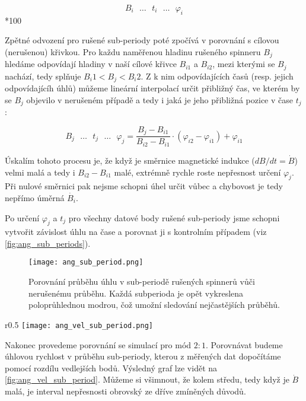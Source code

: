 $$
    B_i \text{ } \ldots \text{ } t_i \text{ } \ldots \text{ } \varphi_i
$$*100

Zpětné odvození pro rušené sub-periody poté zpočívá v porovnání s cílovou (nerušenou) křivkou. Pro každu naměřenou hladinu rušeného spinneru $B_j$ hledáme odpovídají hladiny v naší cílové křivce $B_{i1}$ a $B_{i2}$, mezi kterými se $B_j$ nachází, tedy splňuje $B_i1 < B_j < B_i2$. Z k nim odpovídajících časů (resp. jejich odpovídajícíh úhlů) můžeme lineární interpolací určit přibližný čas, ve kterém by se $B_j$ objevilo v nerušeném případě a tedy i jaká je jeho přibližná pozice v čase $t_j$:

$$
    B_j \text{ } \ldots \text{ } t_j \text{ } \ldots \text{ } \varphi_j = \frac{B_j - B_{i1}}{B_{i2} - B_{i1}} \cdot (\varphi_{i2} - \varphi_{i1}) + \varphi_{i1}
$$

Úskalím tohoto procesu je, že když je směrnice magnetické indukce ($dB/dt = \dot{B}$) velmi malá a tedy i $B_{i2} - B_{i1}$ malé, extrémně rychle roste nepřesnost určení $\varphi_j$. Při nulové směrnici pak nejsme schopni úhel určit vůbec a chybovost je tedy nepřímo úměrná $\dot{B_i}$.

Po určení $\varphi_j$ a $t_j$ pro všechny datové body rušené sub-periody jsme schopni vytvořit závislost úhlu na čase a porovnat ji s kontrolním případem (viz \autoref{fig:ang_sub_periods}). 

\clearpage

\begin{figure}[H]
    \texttt{[image: ang\_sub\_period.png]}
    \centering
    \caption[Porovnání průběhu úhlu v sub-periodě rušených spinnerů vůči nerušenému průběhu]{Porovnání průběhu úhlu v sub-periodě rušených spinnerů vůči nerušenému průběhu. Každá subperioda je opět vykreslena poloprůhlednou modrou, čož umožní sledování nejčastějších průběhů.}
    \label{fig:ang_sub_periods}
\end{figure}

\begin{wrapfigure}{r}{0.5\textwidth}
    \texttt{[image: ang\_vel\_sub\_period.png]}
    \centering
    \caption{Porovnání měřeného a simulovaného průběhu úhlové rychlosti v čase pro mód $2:1$}
    \label{fig:ang_vel_sub_period}
\end{wrapfigure}

Nakonec provedeme porovnání se simulací pro mód $2:1$. Porovnávat budeme úhlovou rychlost v průběhu sub-periody, kterou z měřených dat dopočítáme pomocí rozdílu vedlejších bodů. Výsledný graf lze vidět na \ref{fig:ang_vel_sub_period}. Můžeme si všimnout, že kolem středu, tedy když je $\dot{B}$ malá, je interval nepřesnosti obrovský ze dříve zmíněných důvodů.

